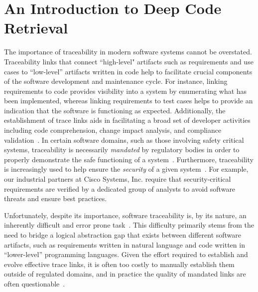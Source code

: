 \chapter{An Introduction to Deep Code Retrieval}
\label{ch:appI-intro}

The importance of traceability in modern software systems cannot be overstated. Traceability links that connect ``high-level" artifacts such as requirements and use cases to ``low-level'' artifacts written in code help to facilitate crucial components of the software development and maintenance cycle. For instance, linking requirements to code provides visibility into a system by enumerating what has been implemented, whereas linking requirements to test cases helps to provide an indication that the software is functioning as expected. Additionally, the establishment of trace links aids in facilitating a broad set of developer activities including code comprehension, change impact analysis, and compliance validation~\citep{Cleland-Huang:Springer'12}.  In certain software domains, such as those involving safety critical systems, traceability is necessarily \textit{mandated} by regulatory bodies in order to properly demonstrate the safe functioning of a system~\citep{Nejati:IST'12,Rempel:ICSE'14,Cleland-Huang:ICSE'10,Mader:Soft'13}. Furthermore, traceability is increasingly used to help ensure the \textit{security} of a given system~\citep{Nhlabatsi:SST'15}. For example, our industrial partners at Cisco Systems, Inc. require that security-critical requirements are verified by a dedicated group of analysts to avoid software threats and ensure best practices. 

Unfortunately, despite its importance, software traceability is, by its nature, an inherently difficult and error prone task~\citep{Cleland-Huang:FOSE'14,Mahmoud:ICPC'12,Mader:Soft'13}. This difficulty primarily stems from the need to bridge a logical abstraction gap that exists between different software artifacts, such as requirements written in natural language and code written in ``lower-level'' programming languages.  %
Given the effort required to establish and evolve effective trace links, it is often too costly to manually establish them outside of regulated domains, and in practice the quality of mandated links are often questionable~\citep{Cleland-Huang:FSE'14}.  

